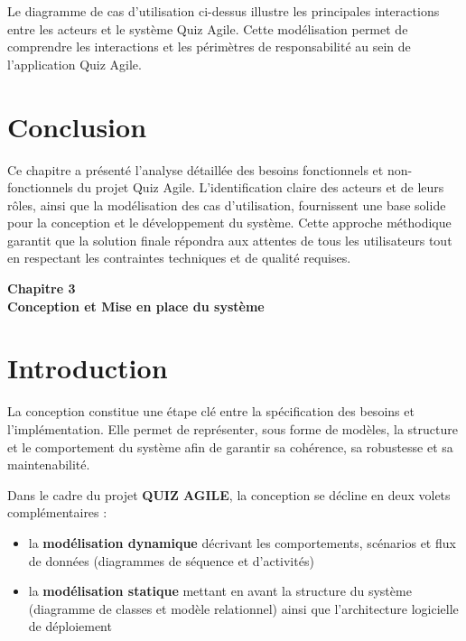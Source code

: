 \documentclass[12pt,a4paper]{report}
\begin{document}
Le diagramme de cas d'utilisation ci-dessus illustre les principales interactions entre les acteurs et le système Quiz Agile. Cette modélisation permet de comprendre les interactions et les périmètres de responsabilité au sein de l'application Quiz Agile.

\section{Conclusion}

Ce chapitre a présenté l'analyse détaillée des besoins fonctionnels et non-fonctionnels du projet Quiz Agile. L'identification claire des acteurs et de leurs rôles, ainsi que la modélisation des cas d'utilisation, fournissent une base solide pour la conception et le développement du système. Cette approche méthodique garantit que la solution finale répondra aux attentes de tous les utilisateurs tout en respectant les contraintes techniques et de qualité requises.


\cleardoublepage
\thispagestyle{empty}
\begin{center}
    \vspace*{4cm}
    {\Huge \textbf{Chapitre 3}}\\[1.5cm]
    {\LARGE \textbf{Conception et Mise en place du système}}
\end{center}
\cleardoublepage

\setcounter{section}{0}

\section{Introduction}

La conception constitue une étape clé entre la spécification des besoins et l'implémentation. Elle permet de représenter, sous forme de modèles, la structure et le comportement du système afin de garantir sa cohérence, sa robustesse et sa maintenabilité.

Dans le cadre du projet \textbf{QUIZ AGILE}, la conception se décline en deux volets complémentaires :
\begin{itemize}
    \item la \textbf{modélisation dynamique} décrivant les comportements, scénarios et flux de données (diagrammes de séquence et d'activités)
    \item la \textbf{modélisation statique} mettant en avant la structure du système (diagramme de classes et modèle relationnel) ainsi que l'architecture logicielle de déploiement
\end{itemize}
\end{document}

